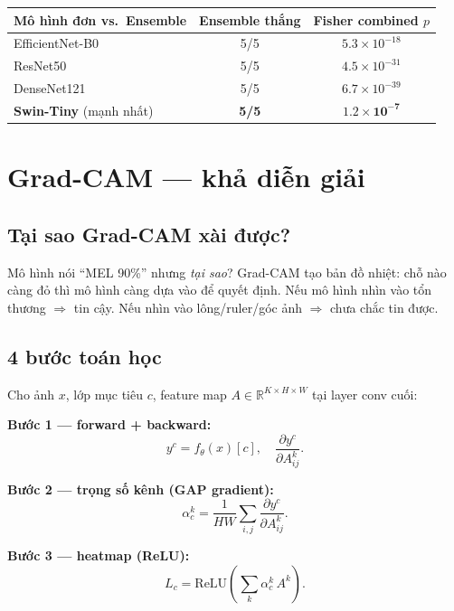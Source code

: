 \documentclass[11pt,a4paper]{article}
\begin{document}
\begin{table}[h]
\centering\small
\begin{tabular}{lcc}
\toprule
\textbf{Mô hình đơn vs.\ Ensemble} & \textbf{Ensemble thắng} & \textbf{Fisher combined $p$} \\
\midrule
EfficientNet-B0 & 5/5 & $5.3 \times 10^{-18}$ \\
ResNet50        & 5/5 & $4.5 \times 10^{-31}$ \\
DenseNet121     & 5/5 & $6.7 \times 10^{-39}$ \\
\textbf{Swin-Tiny} (mạnh nhất) & \textbf{5/5} & $\mathbf{1.2 \times 10^{-7}}$ \\
\bottomrule
\end{tabular}
\end{table}

\section{Grad-CAM --- khả diễn giải}

\subsection{Tại sao Grad-CAM xài được?}

\begin{simple}
Mô hình nói ``MEL 90\%'' nhưng \textit{tại sao}? Grad-CAM tạo bản đồ nhiệt: chỗ nào càng đỏ thì mô hình càng dựa vào để quyết định. Nếu mô hình nhìn vào tổn thương $\Rightarrow$ tin cậy. Nếu nhìn vào lông/ruler/góc ảnh $\Rightarrow$ chưa chắc tin được.
\end{simple}

\subsection{4 bước toán học}

Cho ảnh $x$, lớp mục tiêu $c$, feature map $A \in \mathbb{R}^{K \times H \times W}$ tại layer conv cuối:

\textbf{Bước 1 --- forward + backward:}
\[
  y^c = f_\theta(x)[c], \quad \frac{\partial y^c}{\partial A^k_{ij}}.
\]

\textbf{Bước 2 --- trọng số kênh (GAP gradient):}
\[
  \alpha_c^k = \frac{1}{HW} \sum_{i,j} \frac{\partial y^c}{\partial A^k_{ij}}.
\]

\textbf{Bước 3 --- heatmap (ReLU):}
\[
  L_c = \mathrm{ReLU}\left( \sum_k \alpha_c^k \, A^k \right).
\]
\end{document}
